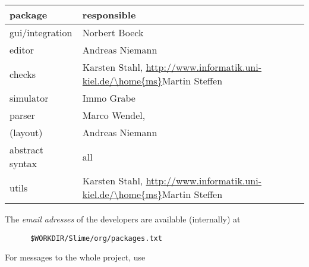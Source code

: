 \begin{table}[htbp]
  \centering
  \begin{tabular}[t]{l@{\quad\quad}l}
     package  &  responsible
     \\\hline
     gui/integration & Norbert Boeck
     \\
     editor & Andreas Niemann
     \\
     checks & 
     Karsten Stahl,
     \url{http://www.informatik.uni-kiel.de/\home{ms}}{Martin Steffen}
     \\
     simulator & Immo Grabe
     \\
     parser & Marco Wendel,
     \\
     (layout) & Andreas Niemann
     \\
     abstract syntax & all
     \\
     utils 
     &
     Karsten Stahl,
     \url{http://www.informatik.uni-kiel.de/\home{ms}}{Martin Steffen}
  \end{tabular}
  \caption{}
  \label{tab:gruppen}
\end{table}




The \emph{email adresses} of the developers are available (internally) at
\begin{verbatim}
      $WORKDIR/Slime/org/packages.txt
\end{verbatim}
For messages to the whole project, use
\fi


